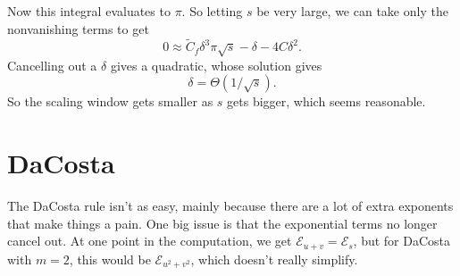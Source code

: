 \documentclass[twoside,10pt]{report}
\begin{document}
	Now  this integral evaluates to $\pi$. So letting $s$ be very large, we can take only the nonvanishing terms to get
	\[
	0 \approx \tilde{C}_f \delta^{3} \pi \sqrt{s} - \delta - 4 C\delta^{2}.
	\] Cancelling out a $\delta$ gives a quadratic, whose solution gives
	\[
		\delta = \Theta(1 / \sqrt{s} ).
	\] 
	So the scaling window gets smaller as $s$ gets bigger, which seems reasonable.




\section{DaCosta}

The DaCosta rule isn't as easy, mainly because there are a lot of extra exponents that make things a pain. One big issue is that the exponential terms no longer cancel out. At one point in the \ER computation, we get $\mathcal{E}_{u+v} = \mathcal{E}_{s}$, but for DaCosta with $m=2$, this would be $\mathcal{E}_{u^2+v^2}$, which doesn't really simplify.
\end{document}
